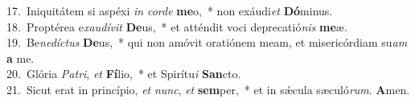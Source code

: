 {17.~}Iniquitátem si aspéxi \textit{in} \textit{cor}\textit{de} \textbf{me}o,~* non exáudi\textit{et} \textbf{Dó}minus.\\
{18.~}Proptérea e\textit{xau}\textit{dí}\textit{vit} \textbf{De}us,~* et atténdit voci deprecatió\textit{nis} \textbf{me}æ.\\
{19.~}Be\textit{ne}\textit{dí}\textit{ctus} \textbf{De}us,~* qui non amóvit oratiónem meam, et misericórdiam su\textit{am} \textbf{a} me.\\
{20.~}Glória \textit{Pa}\textit{tri}, \textit{et} \textbf{Fí}lio,~* et Spirítu\textit{i} \textbf{San}cto.\\
{21.~}Sicut erat in princípio, \textit{et} \textit{nunc}, \textit{et} \textbf{sem}per,~* et in sǽcula sæculó\textit{rum}. \textbf{A}men.\\
